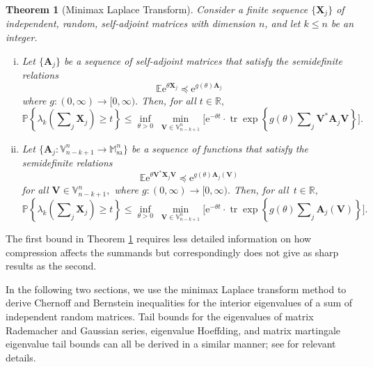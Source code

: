 \documentclass[11pt,letterpaper,twoside,reqno,nosumlimits]{amsart}
\renewcommand{\star}{*}
\newcommand{\mat}[1]{\ensuremath{\bm{#1}}} %
\newcommand{\e}{\ensuremath{\mathrm{e}}}
\newcommand{\E}{\ensuremath{\mathbb{E}}}
\newcommand{\Prob}[1]{\ensuremath{\mathbb{P}\left\{#1\right\}}}
\newcommand{\R}{\ensuremath{\mathbb{R}}}
\newcommand{\Isom}[2]{\ensuremath{\mathbb{V}_{#1}^{#2}}}
\newcommand{\samats}[1]{\ensuremath{\mathbb{M}^{#1}_{\mathrm{sa}}}}
\DeclareMathOperator{\tr}{tr}
\newtheorem{thm}{Theorem}
\theoremstyle{remark}
\numberwithin{equation}{section}
\numberwithin{thm}{section}
\numberwithin{prop}{section}
\numberwithin{defn}{section}
\numberwithin{remark}{section}
\begin{document}
\begin{thm}[Minimax Laplace Transform]
Consider a finite sequence $\{\mat{X}_j\}$ of independent, random, self-adjoint matrices with dimension $n$, and let $k\leq n$ be an integer.
\begin{enumerate}[(i)]
 \item Let $\{\mat{A}_j\}$ be a sequence of self-adjoint matrices that satisfy the semidefinite relations
\[
 \E\e^{\theta \mat{X}_j} \preceq \e^{g(\theta) \mat{A}_j}
\]
where $g : (0,\infty) \rightarrow [0, \infty).$ Then, for all $t \in \R,$ 
\[
 \Prob{\lambda_k\left(\sum\nolimits_j \mat{X}_j \right) \geq t } \leq \inf_{\theta > 0}\; \min_{\mat{V} \in \Isom{n-k+1}{n}} \bigg[ \e^{-\theta t} \cdot \tr \exp\left\{ g(\theta) \sum\nolimits_j \mat{V}^\star \mat{A}_j \mat{V}\right\}\bigg].
\]
 \label{eqn:uncompressedeigtails}
\item Let $\{\mat{A}_j:\Isom{n-k+1}{n} \rightarrow \samats{n} \}$ be a sequence of functions that satisfy the semidefinite relations 
\[
 \E\e^{\theta\mat{V}^\star \mat{X}_j \mat{V}} \preceq \e^{g(\theta) \mat{A}_j(\mat{V})}
\]
for all $\mat{V} \in \Isom{n-k+1}{n},$ where $g : (0, \infty) \rightarrow [0, \infty).$ Then, for all~$t \in \R,$
\[
 \Prob{\lambda_k\left(\sum\nolimits_j \mat{X}_j \right) \geq t } \leq \inf_{\theta > 0 } \; \min_{\mat{V} \in \Isom{n-k+1}{n}} \bigg[ \e^{-\theta t} \cdot \tr \exp\left\{ g(\theta) \sum\nolimits_j \mat{A}_j(\mat{V}) \right\}\bigg].
\]
 \label{eqn:compressedeigtails}
\end{enumerate}

\label{thm:eigtails}
\end{thm}

The first bound in Theorem \ref{thm:eigtails} requires less detailed information on how compression affects the summands but correspondingly does not give as sharp results as the second. %

In the following two sections, we use the minimax Laplace transform method to derive Chernoff and Bernstein inequalities for the interior eigenvalues of a sum of independent random matrices. Tail bounds for the eigenvalues of matrix Rademacher and Gaussian series, eigenvalue Hoeffding, and matrix martingale eigenvalue tail bounds can all be derived in a similar manner; see \cite{T10a} for relevant details.
\end{document}
